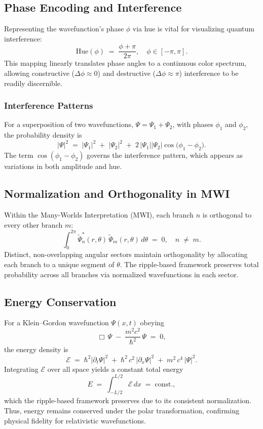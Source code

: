 \documentclass{article}
\begin{document}
\subsection{Phase Encoding and Interference}
Representing the wavefunction’s phase \(\phi\) via hue is vital for visualizing quantum interference:
\[
\text{Hue}(\phi) \;=\; \frac{\phi + \pi}{2\pi}, 
\quad \phi \in [-\pi, \pi].
\]
This mapping linearly translates phase angles to a continuous color spectrum, allowing constructive (\(\Delta \phi \approx 0\)) and destructive (\(\Delta \phi \approx \pi\)) interference to be readily discernible.

\subsubsection{Interference Patterns}
For a superposition of two wavefunctions, \(\Psi = \Psi_1 + \Psi_2\), with phases \(\phi_1\) and \(\phi_2\), the probability density is
\[
\bigl|\Psi\bigr|^2
\;=\;
\bigl|\Psi_1\bigr|^2
\;+\;
\bigl|\Psi_2\bigr|^2
\;+\;
2\,\bigl|\Psi_1\bigr|\bigl|\Psi_2\bigr|\cos\bigl(\phi_1 - \phi_2\bigr).
\]
The term \(\cos(\phi_1 - \phi_2)\) governs the interference pattern, which appears as variations in both amplitude and hue.

\subsection{Normalization and Orthogonality in MWI}
Within the Many-Worlds Interpretation (MWI), each branch \(n\) is orthogonal to every other branch \(m\):
\[
\int_{0}^{2\pi}
\tilde{\Psi}_n^*(r,\theta)\,\tilde{\Psi}_m(r,\theta)\,d\theta
\;=\; 0,
\quad n \;\neq\; m.
\]
Distinct, non-overlapping angular sectors maintain orthogonality by allocating each branch to a unique segment of \(\theta\). The ripple-based framework preserves total probability across all branches via normalized wavefunctions in each sector.

\subsection{Energy Conservation}
For a Klein--Gordon wavefunction \(\Psi(x,t)\) obeying
\[
\Box\,\Psi
\;-\;
\frac{m^2 c^2}{\hbar^2}\,\Psi
\;=\; 0,
\]
the energy density is
\[
\mathcal{E}
\;=\;
\hbar^2\bigl|\partial_t \Psi\bigr|^2
\;+\;
\hbar^2\,c^2\,\bigl|\partial_x \Psi\bigr|^2
\;+\;
m^2\,c^4\,\bigl|\Psi\bigr|^2.
\]
Integrating \(\mathcal{E}\) over all space yields a constant total energy
\[
E
\;=\;
\int_{-L/2}^{L/2}
\mathcal{E}\,dx
\;=\;
\text{const.},
\]
which the ripple-based framework preserves due to its consistent normalization. Thus, energy remains conserved under the polar transformation, confirming physical fidelity for relativistic wavefunctions.
\end{document}
